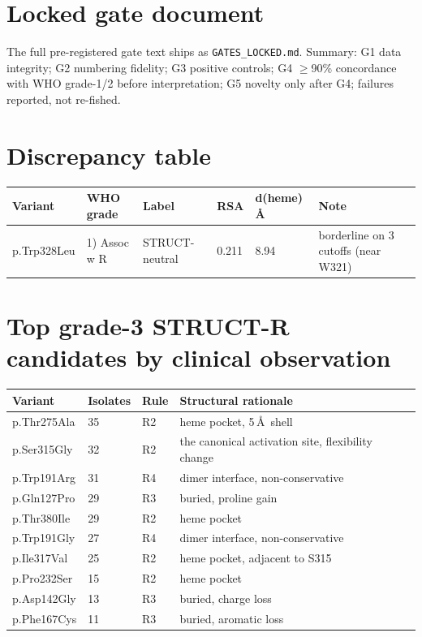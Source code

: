 \documentclass[11pt]{article}
\begin{document}
\newpage
\appendix
\section{Locked gate document}
The full pre-registered gate text ships as \texttt{GATES\_LOCKED.md}. Summary: G1 data integrity; G2 numbering fidelity; G3 positive controls; G4 $\geq$90\% concordance with WHO grade-1/2 before interpretation; G5 novelty only after G4; failures reported, not re-fished.

\section{Discrepancy table}
\begin{center}
\begin{tabular}{llllll}
\hline
Variant & WHO grade & Label & RSA & d(heme) \AA & Note\\
\hline
p.Trp328Leu & 1) Assoc w R & STRUCT-neutral & 0.211 & 8.94 & borderline on 3 cutoffs (near W321)\\
\hline
\end{tabular}
\end{center}

\section{Top grade-3 STRUCT-R candidates by clinical observation}
\begin{center}
\begin{tabular}{llll}
\hline
Variant & Isolates & Rule & Structural rationale\\
\hline
p.Thr275Ala & 35 & R2 & heme pocket, 5\,\AA\ shell\\
p.Ser315Gly & 32 & R2 & the canonical activation site, flexibility change\\
p.Trp191Arg & 31 & R4 & dimer interface, non-conservative\\
p.Gln127Pro & 29 & R3 & buried, proline gain\\
p.Thr380Ile & 29 & R2 & heme pocket\\
p.Trp191Gly & 27 & R4 & dimer interface, non-conservative\\
p.Ile317Val & 25 & R2 & heme pocket, adjacent to S315\\
p.Pro232Ser & 15 & R2 & heme pocket\\
p.Asp142Gly & 13 & R3 & buried, charge loss\\
p.Phe167Cys & 11 & R3 & buried, aromatic loss\\
\hline
\end{tabular}
\end{center}
\end{document}
